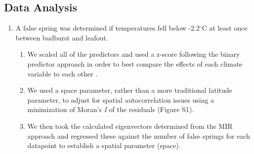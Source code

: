 \documentclass{article}\usepackage[]{graphicx}\usepackage[]{color}
\begin{document}
\subsection*{Data Analysis}
\begin{enumerate}
\item A false spring was determined if temperatures fell below -2.2$^{\circ}$C at least once between budburst and leafout.
\begin{enumerate}
\item We scaled all of the predictors and used a z-score following the binary predictor approach in order to best compare the effects of each climate variable to each other \citep{Gelman2006}.
\item We used a space parameter, rather than a more traditional latitude parameter, to adjust for spatial autocorrelation issues using a minimization of Moran's \textit{I} of the residuals \citep{Baumen2017} (Figure S1).
\item We then took the calculated eigenvectors determined from the MIR approach and regressed these against the number of false springs for each datapoint to establish a spatial parameter (space). %
\end{enumerate}


\end{enumerate}
\end{document}
